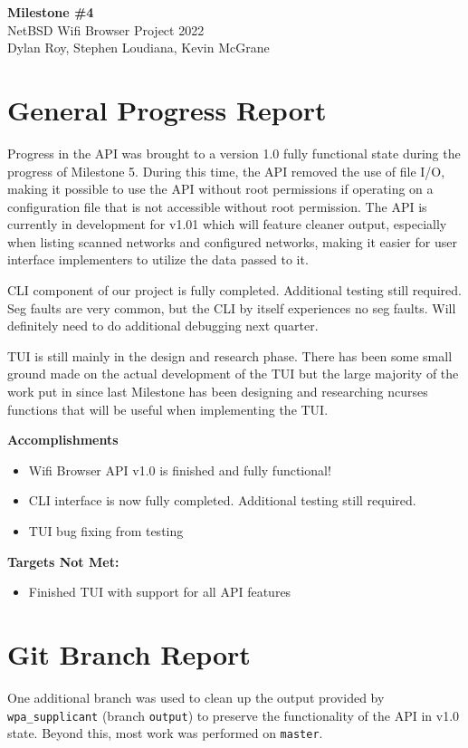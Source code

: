 \documentclass[11pt]{article}
\begin{document}
\begin{center}
  \textbf{\Large Milestone \#4}\\\large NetBSD Wifi Browser Project 2022\\
  Dylan Roy, Stephen Loudiana, Kevin McGrane
\end{center}


\section{General Progress Report}
Progress in the API was brought to a version 1.0 fully functional state during
the progress of Milestone 5. During this time, the API removed the use of file
I/O, making it possible to use the API without root permissions if operating on
a configuration file that is not accessible without root permission. The API is
currently in development for v1.01 which will feature cleaner output, especially
when listing scanned networks and configured networks, making it easier for user
interface implementers to utilize the data passed to it.

CLI component of our project is fully completed. Additional testing still 
required. Seg faults are very common, but the CLI by itself experiences no seg 
faults. Will definitely need to do additional debugging next quarter.

TUI is still mainly in the design and research phase. There has been some small
ground made on the actual development of the TUI but the large majority of the
work put in since last Milestone has been designing and researching ncurses functions 
that will be useful when implementing the TUI.

\textbf{Accomplishments}
\begin{itemize}
  \item Wifi Browser API v1.0 is finished and fully functional!
  \item CLI interface is now fully completed. Additional testing still required. 
  \item TUI bug fixing from testing
\end{itemize}

\textbf{Targets Not Met:}
\begin{itemize}
  \item Finished TUI with support for all API features
\end{itemize}


\section{Git Branch Report}
One additional branch was used to clean up the output provided by \texttt{wpa\_supplicant}
(branch \texttt{output}) to preserve the functionality of the API in v1.0 state.
Beyond this, most work was performed on \texttt{master}.
\end{document}
